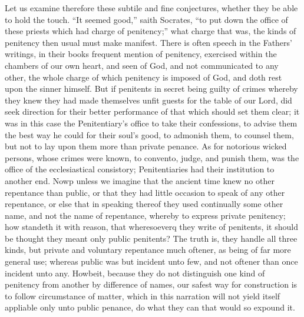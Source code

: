 Let us examine therefore these subtile and fine conjectures, whether they be able to hold the touch. “It seemed good,” saith Socrates, “to put down the office of these priests which had charge of penitency;” what charge that was, the  kinds of penitency then usual must make manifest. There is often speech in the Fathers’ writings, in their books frequent mention of penitency, exercised within the chambers of our own heart, and seen of God, and not communicated to any other, the whole charge of which penitency is imposed of God, and doth rest upon the sinner himself. But if penitents in secret being guilty of crimes whereby they knew they had made themselves unfit guests for the table of our Lord, did seek direction for their better performance of that which should set them clear; it was in this case the Penitentiary’s office to take their confessions, to advise them the best way he could for their soul’s good, to admonish them, to counsel them, but not to lay upon them more than private penance. As for notorious wicked persons, whose crimes were known, to convento, judge, and punish them, was the office of the ecclesiastical consistory; Penitentiaries had their institution to another end. Nowp unless we imagine that the ancient time knew no other repentance than public, or that they had little occasion to speak of any other repentance, or else that in speaking thereof they used continually some other name, and not the name of repentance, whereby to express private penitency; how standeth it with reason, that wheresoeverq they write of penitents, it should be thought they meant only public penitents? The truth is, they handle all three kinds, but private and voluntary repentance much oftener, as being of far more general use; whereas public was but incident unto few, and not oftener than once incident unto any. Howbeit, because they do not distinguish one kind of penitency from another by difference of names, our safest way for construction is to follow circumstance of matter, which in this narration will not yield itself appliable only unto public penance, do what they can that would so expound it.

